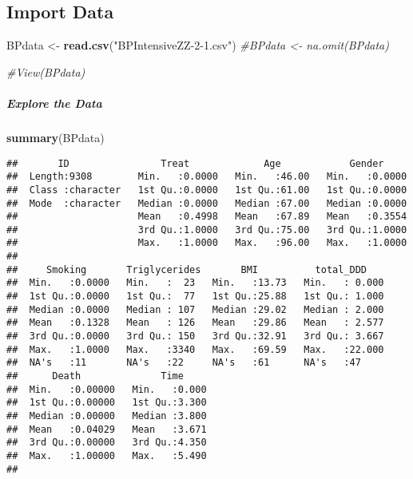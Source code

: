 \documentclass[
]{article}
\newenvironment{Shaded}{\begin{snugshade}}{\end{snugshade}}
\newcommand{\CommentTok}[1]{\textcolor[rgb]{0.56,0.35,0.01}{\textit{#1}}}
\newcommand{\FunctionTok}[1]{\textcolor[rgb]{0.13,0.29,0.53}{\textbf{#1}}}
\newcommand{\NormalTok}[1]{#1}
\newcommand{\OtherTok}[1]{\textcolor[rgb]{0.56,0.35,0.01}{#1}}
\newcommand{\StringTok}[1]{\textcolor[rgb]{0.31,0.60,0.02}{#1}}
\begin{document}
\subsection{Import Data}\label{import-data}

\begin{Shaded}
\begin{Highlighting}[]
\NormalTok{BPdata }\OtherTok{\textless{}{-}} \FunctionTok{read.csv}\NormalTok{(}\StringTok{"BPIntensiveZZ{-}2{-}1.csv"}\NormalTok{)}
\CommentTok{\#BPdata \textless{}{-} na.omit(BPdata)}

\CommentTok{\#View(BPdata)}
\end{Highlighting}
\end{Shaded}

\newpage

\subparagraph{Explore the Data}\label{explore-the-data}

\begin{Shaded}
\begin{Highlighting}[]
\FunctionTok{summary}\NormalTok{(BPdata)}
\end{Highlighting}
\end{Shaded}

\begin{verbatim}
##       ID                Treat             Age            Gender      
##  Length:9308        Min.   :0.0000   Min.   :46.00   Min.   :0.0000  
##  Class :character   1st Qu.:0.0000   1st Qu.:61.00   1st Qu.:0.0000  
##  Mode  :character   Median :0.0000   Median :67.00   Median :0.0000  
##                     Mean   :0.4998   Mean   :67.89   Mean   :0.3554  
##                     3rd Qu.:1.0000   3rd Qu.:75.00   3rd Qu.:1.0000  
##                     Max.   :1.0000   Max.   :96.00   Max.   :1.0000  
##                                                                      
##     Smoking       Triglycerides       BMI          total_DDD     
##  Min.   :0.0000   Min.   :  23   Min.   :13.73   Min.   : 0.000  
##  1st Qu.:0.0000   1st Qu.:  77   1st Qu.:25.88   1st Qu.: 1.000  
##  Median :0.0000   Median : 107   Median :29.02   Median : 2.000  
##  Mean   :0.1328   Mean   : 126   Mean   :29.86   Mean   : 2.577  
##  3rd Qu.:0.0000   3rd Qu.: 150   3rd Qu.:32.91   3rd Qu.: 3.667  
##  Max.   :1.0000   Max.   :3340   Max.   :69.59   Max.   :22.000  
##  NA's   :11       NA's   :22     NA's   :61      NA's   :47      
##      Death              Time      
##  Min.   :0.00000   Min.   :0.000  
##  1st Qu.:0.00000   1st Qu.:3.300  
##  Median :0.00000   Median :3.800  
##  Mean   :0.04029   Mean   :3.671  
##  3rd Qu.:0.00000   3rd Qu.:4.350  
##  Max.   :1.00000   Max.   :5.490  
## 
\end{verbatim}
\end{document}
